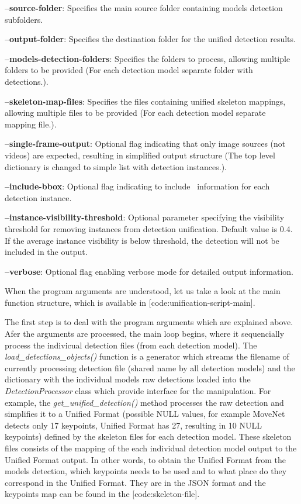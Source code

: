 \startitemize
    \item {\bf --source-folder}: Specifies the main source folder containing models detection subfolders.
    \item {\bf --output-folder}: Specifies the destination folder for the unified detection results.
    \item {\bf --models-detection-folders}: Specifies the folders to process, allowing multiple folders to be provided (For each detection model separate folder with detections.).
    \item {\bf --skeleton-map-files}: Specifies the files containing unified skeleton mappings, allowing multiple files to be provided (For each detection model separate mapping file.).
    \item {\bf --single-frame-output}: Optional flag indicating that only image sources (not videos) are expected, resulting in simplified output structure (The top level dictionary is changed to simple list with detection instances.).
    \item {\bf --include-bbox}: Optional flag indicating to include \BBOX\ information for each detection instance.
    \item {\bf --instance-visibility-threshold}: Optional parameter specifying the visibility threshold for removing instances from detection unification. Default value is 0.4. If the average instance visibility is below threshold, the detection will not be included in the output.
    \item {\bf --verbose}: Optional flag enabling verbose mode for detailed output information.
\stopitemize

When the program arguments are understood, let us take a look at the main function structure, which is available in [code:unification-script-main].


The first step is to deal with the program arguments which are explained above. Afer the arguments are processed, the main loop begins, where it sequencially process the indivicual detection files (from each detection model). The {\it load_detections_objects()} function is a generator which streams the filename of currently processing detection file (shared name by all detection models) and the dictionary with the individual models raw detections loaded into the {\it DetectionProcessor} class which provide interface for the manipulation. For example, the {\it get_unified_detection()} method processes the raw detection and simplifies it to a Unified Format (possible NULL values, for example MoveNet detects only 17 keypoints, Unified Format has 27, resulting in 10 NULL keypoints) defined by the skeleton files for each detection model. These skeleton files consists of the mapping of the each individual detection model output to the Unified Format output. In other words, to obtain the Unified Format from the models detection, which keypoints needs to be used and to what place do they correspond in the Unified Format. They are in the JSON format and the keypoints map can be found in the [code:skeleton-file].


